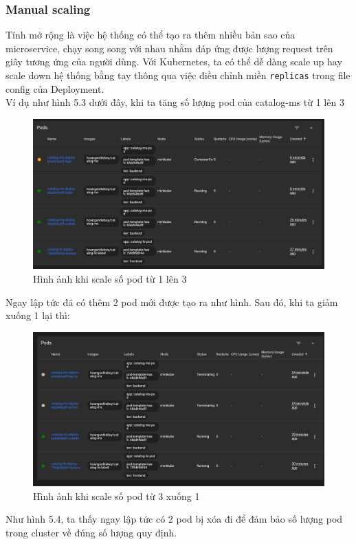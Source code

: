\subsubsection{Manual scaling}
\noindent Tính mở rộng là việc hệ thống có thể tạo ra thêm nhiều bản sao của microservice, chạy song song với nhau nhằm đáp ứng được lượng request trên giây tương ứng của người dùng. Với Kubernetes, ta có thể dễ dàng scale up hay scale down hệ thống bằng tay thông qua việc điều chỉnh miền \lstinline|replicas| trong file config của Deployment.\\[0.5cm]
Ví dụ như hình 5.3 dưới đây, khi ta tăng số lượng pod của catalog-ms từ 1 lên 3
\begin{figure}[H]
  \begin{center}
    \includegraphics[scale=0.45]{images/hanh/catalog_ms_scale_up.png}
    \caption{Hình ảnh khi scale số pod từ 1 lên 3}
  \end{center}
\end{figure}
Ngay lập tức đã có thêm 2 pod mới được tạo ra như hình. Sau đó, khi ta giảm xuống 1 lại thì:
\begin{figure}[H]
  \begin{center}
    \includegraphics[scale=0.45]{images/hanh/catalog_ms_scale_down.png}
    \caption{Hình ảnh khi scale số pod từ 3 xuống 1}
  \end{center}
\end{figure}
Như hình 5.4, ta thấy ngay lập tức có 2 pod bị xóa đi để đảm bảo số lượng pod trong cluster về đúng số lượng quy định.

